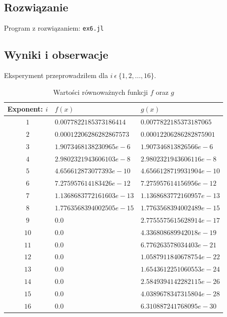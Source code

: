 \documentclass[12pt]{article}
\begin{document}
    \subsection*{Rozwiązanie}
        Program z rozwiązaniem: \texttt{ex6.jl}

    \subsection*{Wyniki i obserwacje}
        Eksperyment przeprowadziłem dla $i \: \epsilon \: \{1, 2, ..., 16\}$.

        \begin{table}[h!]
            \centering
            \begin{tabularx}{0.78\textwidth}{c l l}
                \hline
                Exponent: $i$ & $f(x)$ & $g(x)$ \\
                \hline
                $1$ & $0.0077822185373186414$ & $0.0077822185373187065$ \\
                $2$ & $0.00012206286282867573$ & $0.00012206286282875901$ \\
                $3$ & $1.9073468138230965e-6$ & $1.907346813826566e-6$ \\
                $4$ & $2.9802321943606103e-8$ & $2.9802321943606116e-8$ \\
                $5$ & $4.656612873077393e-10$ & $4.6566128719931904e-10$ \\
                $6$ & $7.275957614183426e-12$ & $7.275957614156956e-12$ \\
                $7$ & $1.1368683772161603e-13$ & $1.1368683772160957e-13$ \\
                $8$ & $1.7763568394002505e-15$ & $1.7763568394002489e-15$ \\
                $9$ & $0.0$ & $2.7755575615628914e-17$ \\
                $10$ & $0.0$ & $4.336808689942018e-19$ \\
                $11$ & $0.0$ & $6.776263578034403e-21$ \\
                $12$ & $0.0$ & $1.0587911840678754e-22$ \\
                $13$ & $0.0$ & $1.6543612251060553e-24$ \\
                $14$ & $0.0$ & $2.5849394142282115e-26$ \\
                $15$ & $0.0$ & $4.0389678347315804e-28$ \\
                $16$ & $0.0$ & $6.310887241768095e-30$ \\
                \hline
            \end{tabularx}
            \caption{Wartości równoważnych funkcji $f$ oraz $g$}
            \label{table:equiv_func}
        \end{table}
\end{document}
